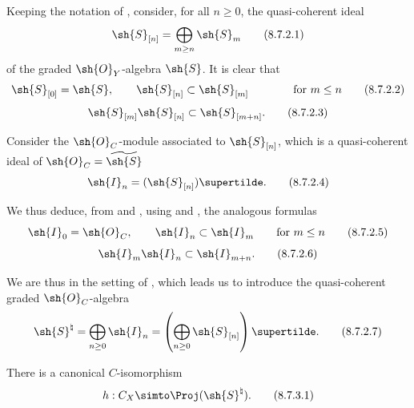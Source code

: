 \begin{env}[8.7.2]
\label{II.8.7.2}
Keeping the notation of , consider, for all $n\geq0$, the quasi-coherent ideal
\[
\label{II.8.7.2.1}
  \sh{S}_{[n]} = \bigoplus_{m\geq n}\sh{S}_m
\tag{8.7.2.1}
\]
of the graded $\sh{O}_Y$-algebra $\sh{S}$.
It is clear that
\[
\label{II.8.7.2.2}
  \sh{S}_{[0]} = \sh{S},
  \qquad
  \sh{S}_{[n]} \subset \sh{S}_{[m]}
  \qquad\qquad
  \mbox{for $m\leq n$}
\tag{8.7.2.2}
\]
\[
\label{II.8.7.2.3}
  \sh{S}_{[m]} \sh{S}_{[n]} \subset \sh{S}_{[m+n]}.
\tag{8.7.2.3}
\]

Consider the $\sh{O}_C$-module associated to $\sh{S}_{[n]}$, which is a quasi-coherent ideal of $\sh{O}_C = \widetilde{\sh{S}}$ 
\[
\label{II.8.7.2.4}
  \sh{I}_n = (\sh{S}_{[n]})\supertilde.
\tag{8.7.2.4}
\]

We thus deduce, from  and , using  and , the analogous formulas
\[
\label{II.8.7.2.5}
  \sh{I}_{0} = \sh{O}_C,
  \qquad
  \sh{I}_{n} \subset \sh{I}_{m}
  \qquad
  \text{for }m\leq n
\tag{8.7.2.5}
\]
\[
\label{II.8.7.2.6}
  \sh{I}_{m} \sh{I}_{n} \subset \sh{I}_{m+n}.
\tag{8.7.2.6}
\]

We are thus in the setting of , which leads us to introduce the quasi-coherent graded $\sh{O}_C$-algebra
\[
\label{II.8.7.2.7}
  \sh{S}^\natural
  =
  \bigoplus_{n\geq0}\sh{I}_n
  =
  \left(
    \bigoplus_{n\geq0} \sh{S}_{[n]}
  \right)\supertilde.
\tag{8.7.2.7}
\]
\end{env}

\begin{proposition}[8.7.3]
\label{II.8.7.3}
There is a canonical $C$-isomorphism
\[
\label{II.8.7.3.1}
  h: C_X \simto \Proj(\sh{S}^\natural).
\tag{8.7.3.1}
\]
\end{proposition}

